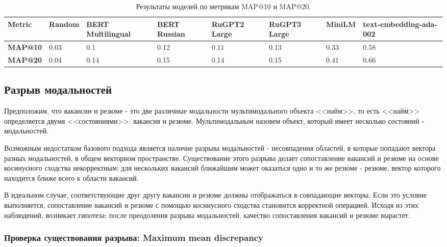 \documentclass{article}
\begin{document}
\begin{table}[h!]
\centering
\begin{tabularx}{\textwidth}{lXXXXXXX}
\toprule
\textbf{Metric} & \textbf{Random} & \textbf{BERT Multilingual} & \textbf{BERT Russian} & \textbf{RuGPT2 Large} & \textbf{RuGPT3 Large} & \textbf{MiniLM} & \textbf{text-embedding-ada-002} \\
\midrule
\textbf{MAP@10} & 0.03 & 0.1 & 0.12 & 0.11 & 0.13 & 0.33 & 0.58 \\
\textbf{MAP@20} & 0.04 & 0.14 & 0.15 & 0.14 & 0.15 & 0.41 & 0.66 \\
\bottomrule
\end{tabularx}
\caption{Результаты моделей по метрикам MAP@10 и MAP@20.}
\label{tab:results}
\end{table}

\subsection{Разрыв модальностей}

Предположим, что вакансии и резюме - это две различные модальности мультимодального объекта <<найм>>, то есть <<найм>> определяется двумя <<состояниями>>: вакансия и резюме.  Мультимодальным назовем объект, который имеет несколько состояний - модальностей. 

Возможным недостатком базового подхода является наличие разрыва модальностей - несовпадения областей, в которые попадают вектора разных модальностей, в общем векторном пространстве. Существование этого разрыва делает сопоставление вакансий и резюме на основе косинусного сходства некорректным: для нескольких вакансий ближайшим может оказаться одно и то же резюме - резюме, вектор которого находится ближе всего к области вакансий.

В идеальном случае, соответствующие друг другу вакансии и резюме должны отображаться в совпадающие векторы. Если это условие выполняется, сопоставление вакансий и резюме с помощью косинусного сходства становится корректной операцией. Исходя из этих наблюдений, возникает гипотеза: после преодоления разрыва модальностей, качество сопоставления вакансий и резюме вырастет.

\subsubsection{Проверка существования разрыва: Maximum mean discrepancy}
\end{document}
